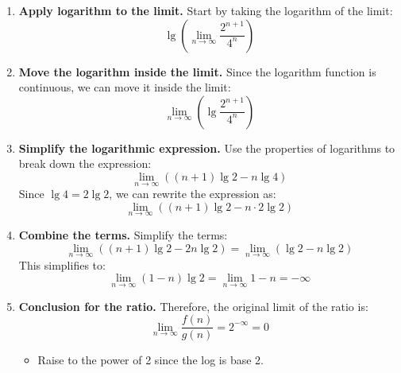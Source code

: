     \begin{example}
        \begin{enumerate}

            \item \textbf{Apply logarithm to the limit.}
            Start by taking the logarithm of the limit:
            \[
            \lg \left( \lim_{n \to \infty} \frac{2^{n+1}}{4^n} \right)
            \]
        
            \item \textbf{Move the logarithm inside the limit.}
            Since the logarithm function is continuous, we can move it inside the limit:
            \[
            \lim_{n \to \infty} \left( \lg \frac{2^{n+1}}{4^n} \right)
            \]
        
            \item \textbf{Simplify the logarithmic expression.}
            Use the properties of logarithms to break down the expression:
            \[
            \lim_{n \to \infty} \left( (n+1) \lg 2 - n \lg 4 \right)
            \]
            Since \( \lg 4 = 2 \lg 2 \), we can rewrite the expression as:
            \[
            \lim_{n \to \infty} \left( (n+1) \lg 2 - n \cdot 2 \lg 2 \right)
            \]
        
            \item \textbf{Combine the terms.}
            Simplify the terms:
            \[
            \lim_{n \to \infty} \left( (n+1) \lg 2 - 2n \lg 2 \right) = \lim_{n \to \infty} \left( \lg 2 - n \lg 2 \right)
            \]
            This simplifies to:
            \[
            \lim_{n \to \infty} (1 - n) \lg 2 = \lim_{n \to \infty} 1 - n = -\infty
            \]
        
            \item \textbf{Conclusion for the ratio.}
            Therefore, the original limit of the ratio is:
            \[
            \lim_{n \to \infty} \frac{f(n)}{g(n)} = 2^{-\infty} = 0
            \]
            \begin{itemize}
                \item Raise to the power of 2 since the log is base 2.
            \end{itemize}
            
        \end{enumerate}
    \end{example}
